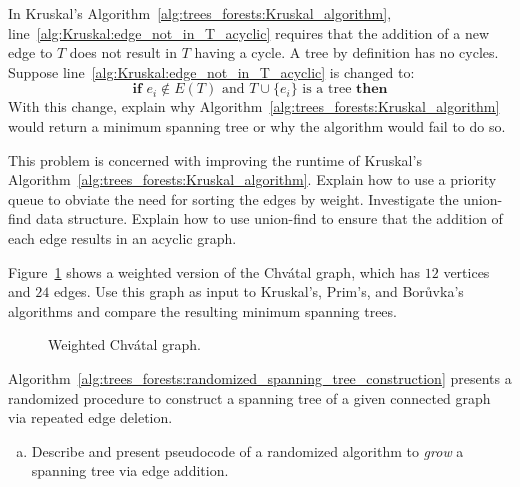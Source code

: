 \begin{problem}
\item In Kruskal's
  Algorithm~\ref{alg:trees_forests:Kruskal_algorithm},
  line~\ref{alg:Kruskal:edge_not_in_T_acyclic} requires that the
  addition of a new edge to $T$ does not result in $T$ having a
  cycle. A tree by definition has no cycles. Suppose
  line~\ref{alg:Kruskal:edge_not_in_T_acyclic} is changed to:
  \[
  \textbf{if } e_i \notin E(T)
  \text{ and }
  T \cup \{e_i\} \text{ is a tree } \textbf{then}
  \]
  With this change, explain why
  Algorithm~\ref{alg:trees_forests:Kruskal_algorithm} would return a
  minimum spanning tree or why the algorithm would fail to do so.

\item This problem is concerned with improving the runtime of
  Kruskal's
  Algorithm~\ref{alg:trees_forests:Kruskal_algorithm}. Explain how to
  use a priority queue to obviate the need for sorting the edges by
  weight. Investigate the union-find data
  structure. Explain how to use union-find to ensure that the addition
  of each edge results in an acyclic graph.

\item Figure~\ref{fig:trees_forests:weighted_Chvatal_graph} shows a
  weighted version of the Chv\'atal graph,
  which has $12$ vertices and $24$ edges. Use this graph as input to
  Kruskal's,
  Prim's, and
  Bor\r{u}vka's algorithms and compare
  the resulting minimum spanning trees.

\begin{figure}[!htbp]
\centering
{}

\caption{Weighted Chv\'atal graph.}
\label{fig:trees_forests:weighted_Chvatal_graph}
\end{figure}

\item Algorithm~\ref{alg:trees_forests:randomized_spanning_tree_construction}
  presents a randomized procedure to construct a
  spanning tree of a
  given connected graph via repeated edge deletion.
  \begin{enumerate}[(a)]
  \item Describe and present pseudocode of a
    randomized algorithm to \emph{grow} a
    spanning tree via edge addition.


\end{enumerate}
\end{problem}

